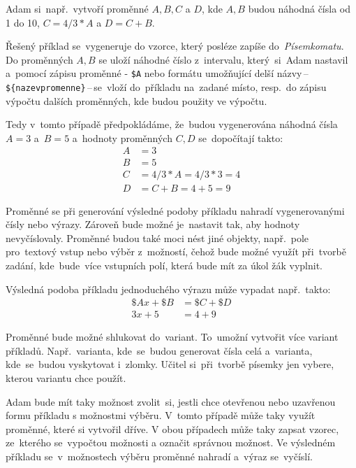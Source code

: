 \documentclass[14pt,a4paper]{article}
\begin{document}
        Adam si~např.~vytvoří proměnné $A, B, C$ a $D$, kde $A, B$ budou náhodná čísla od 1 do 10, $C = 4/3*A$ a $D = C + B$.

        Řešený příklad se~vygeneruje do vzorce, který posléze zapíše do~\emph{Písemkomatu}. Do proměnných $A, B$ se uloží náhodné číslo
        z~intervalu, který~si~Adam nastavil a~pomocí zápisu proměnné - \texttt{\$A} nebo formátu umožňující
        delší názvy\,--\,\texttt{\$\{nazevpromenne\}}\,--\,se~vloží do~příkladu na~zadané místo, resp.~do zápisu výpočtu dalších proměnných,
        kde budou použity ve výpočtu.
        
        Tedy v~tomto případě předpokládáme, že~budou vygenerována náhodná čísla $A = 3$ a~$B = 5$
        a~hodnoty proměnných $C, D$ se~dopočítají takto:
        \begin{align*}
            A &= 3 \\
            B &= 5 \\
            C &= 4/3*A = 4/3*3 = 4 \\
            D &= C + B = 4 + 5 = 9
        \end{align*}

        Proměnné se při generování výsledné podoby příkladu nahradí vygenerovanými čísly nebo výrazy.
        Zároveň bude možné je~nastavit tak, aby hodnoty nevyčíslovaly. Proměnné budou také moci nést jiné objekty, např.~pole pro~textový vstup
        nebo výběr z~možností, čehož bude možné využít při~tvorbě zadání, kde~bude~více vstupních polí, která bude mít za úkol žák vyplnit.

        Výsledná podoba příkladu jednoduchého výrazu může vypadat např.~takto:
        \begin{align*}
            \$Ax + \$B &= \$C + \$D \\
            3x + 5 &= 4 + 9
        \end{align*}

        Proměnné bude možné shlukovat do~variant. To~umožní vytvořit více variant příkladů. Např.~varianta, kde~se~budou generovat čísla celá a~varianta, kde~se~budou vyskytovat i~zlomky.
        Učitel si~při~tvorbě písemky jen vybere, kterou variantu chce použít.

        Adam bude mít taky možnost zvolit~si, jestli chce otevřenou nebo uzavřenou formu příkladu s možnostmi výběru.
        V~tomto případě může taky využít proměnné, které si vytvořil dříve. V obou případech může taky zapsat vzorec,
        ze~kterého se~vypočtou možnosti a označit správnou možnost.
        Ve výsledném příkladu se~v~možnostech výběru proměnné nahradí a~výraz se~vyčíslí.
\end{document}
